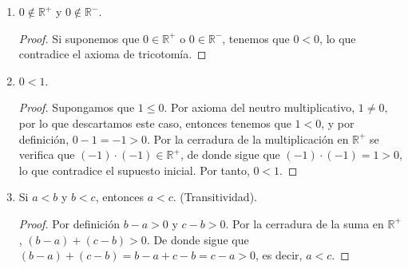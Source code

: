 \documentclass[11pt]{article}
\newcommand{\R}{\mathbb{R}}
\newcommand{\bfit}[1]{\textbf{\textit{#1}}}
\let\set\Set
\begin{document}
\begin{enumerate}[label=\alph*)]

    \item $0\notin \R^+$ y $0\notin \R^-$.
    \vspace{-1em}\begin{proof} 
    Si suponemos que $0\in \R^+$ o $0\in \R^-$, tenemos que $0<0$, lo que contradice el axioma de tricotomía.
    \end{proof} \vspace{-1em}

    \item $0<1$.%
    \vspace{-1em}\begin{proof} 
        Supongamos que $1\leq 0$. Por axioma del neutro multiplicativo, $1\neq 0$, por lo que descartamos este caso, entonces tenemos que $1<0$, y por definición, $0-1=-1>0$. Por la cerradura de la multiplicación en $\R^+$ se verifica que $(-1) \cdot (-1) \in \R^+$, de donde sigue que $(-1) \cdot (-1) = 1>0$, lo que contradice el supuesto inicial. Por tanto, $0<1$.
    \end{proof} \vspace{-1em}

    \item Si $a<b$ y $b<c$, entonces $a<c$. (Transitividad).
    \vspace{-1em}\begin{proof} 
        Por definición $b-a >0$ y $c-b >0$. Por la cerradura de la suma en $\R^+$, $(b-a) + (c-b) >0$. De donde sigue que $(b-a)+(c-b)=b-a+c-b=c-a>0$, es decir, $a<c$.
    \end{proof} \vspace{-1em}


\end{enumerate}
\end{document}
